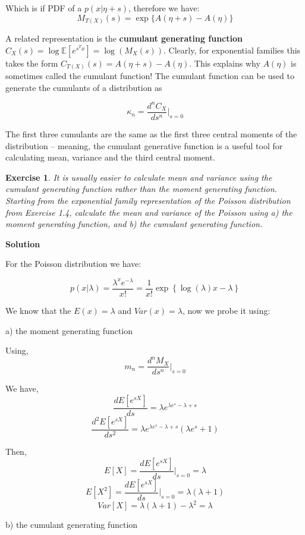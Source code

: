 \documentclass[twoside]{article}
\newcounter{lecnum}
\newtheorem{exercise}{Exercise}[lecnum]
\newcommand\E{\mathbb{E}}
\begin{document}
Which is if PDF of a $p(x|\eta + s)$, therefore we have:
$$
M_{T(X)}(s) = \exp\{ A(\eta+s) - A(\eta) \} 
$$

 \color{black}
\vspace{10mm}

A related representation is the \textbf{cumulant generating function} $C_X(s) = \log \E[e^{s^Tx}] = \log(M_X(s))$. Clearly, for exponential families this takes the form $C_{T(X)}(s) = A(\eta+s)-A(\eta)$. This explains why $A(\eta)$ is sometimes called the cumulant function! The cumulant function can be used to generate the cumulants of a distribution as

$$\kappa_n = \frac{d^nC_X}{ds^n}\Bigr|_{s=0}$$

The first three cumulants are the same as the first three central moments of the distribution -- meaning, the cumulant generative function is a useful tool for calculating mean, variance and the third central moment.

\begin{exercise}
  It is usually easier to calculate mean and variance using the cumulant generating function rather than the moment generating function. Starting from the exponential family representation of the Poisson distribution from Exercise 1.4, calculate the mean and variance of the Poisson using a) the moment generating function, and b) the cumulant generating function.
  \end{exercise}

 \color{blue}
\textbf{Solution}

For the Poisson distribution we have:

$$p(x|\lambda) = \frac{\lambda^xe^{-\lambda}}{x!} = \frac{1}{x!} \exp\left\{\log\left( \lambda \right)x -\lambda  \right\}  $$

We know that the $E(x) = \lambda$ and $Var(x)=\lambda$, now we probe it using:

 a) the moment generating function
 
 Using, 
 $$m_n = \frac{d^nM_X}{ds^n}\Bigr|_{s=0}$$

We have,
$$ \frac{d E[e^{sX}]}{ds}= \lambda e^{\lambda e^s-\lambda + s}$$
$$ \frac{d^2 E[e^{sX}]}{ds^2}= \lambda e^{\lambda e^s-\lambda + s} (\lambda e^s +1)$$

Then,
$$ E[X]= \frac{d E[e^{sX}]}{ds}\Bigr|_{s=0} = \lambda$$
$$ E[X^2]= \frac{d E[e^{sX}]}{ds}\Bigr|_{s=0}= \lambda (\lambda + 1)$$
$$ Var[X] =  \lambda (\lambda + 1) - \lambda^2 = \lambda $$
 
b) the cumulant generating function
\end{document}
